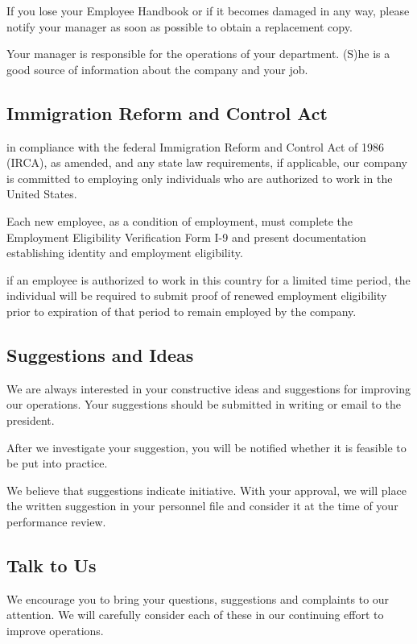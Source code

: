 If you lose your Employee Handbook or if it becomes damaged in any way, please notify your manager as soon as possible to obtain a replacement copy.

Your manager is responsible for the operations of your department. (S)he is a good source of information about the company and your job.

\subsection{Immigration Reform and Control Act}

in compliance with the federal Immigration Reform and Control Act of 1986 (IRCA), as amended, and any state law requirements, if applicable, our company is committed to employing only individuals who are authorized to work in the United States.

Each new employee, as a condition of employment, must complete the Employment Eligibility Verification Form I-9 and present documentation establishing identity and employment eligibility. 

if an employee is authorized to work in this country for a limited time period, the individual will be required to submit proof of renewed employment eligibility prior to expiration of that period to remain employed by the company.

\subsection{Suggestions and Ideas}

We are always interested in your constructive ideas and suggestions for improving our operations. Your suggestions should be submitted in writing or email to the president.

After we investigate your suggestion, you will be notified whether it is feasible to be put into practice.

We believe that suggestions indicate initiative. With your approval, we will place the written suggestion in your personnel file and consider it at the time of your performance review.

\subsection{Talk to Us}

We encourage you to bring your questions, suggestions and complaints to our attention. We will carefully consider each of these in our continuing effort to improve operations.


